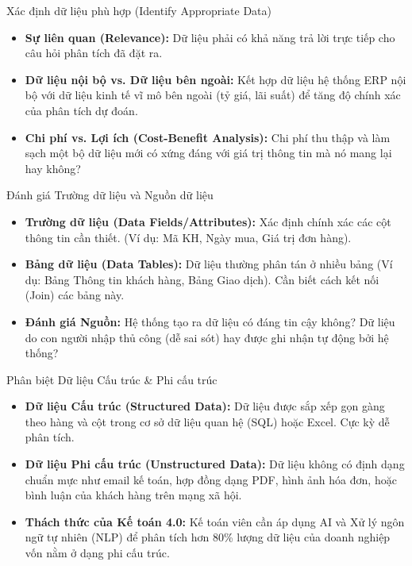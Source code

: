 \documentclass[aspectratio=169,12pt]{beamer}
\begin{document}
\begin{frame}{Xác định dữ liệu phù hợp (Identify Appropriate Data)}
\begin{itemize}
    \item \textbf{Sự liên quan (Relevance):} Dữ liệu phải có khả năng trả lời trực tiếp cho câu hỏi phân tích đã đặt ra. 
    \item \textbf{Dữ liệu nội bộ vs. Dữ liệu bên ngoài:} Kết hợp dữ liệu hệ thống ERP nội bộ với dữ liệu kinh tế vĩ mô bên ngoài (tỷ giá, lãi suất) để tăng độ chính xác của phân tích dự đoán.
    \item \textbf{Chi phí vs. Lợi ích (Cost-Benefit Analysis):} Chi phí thu thập và làm sạch một bộ dữ liệu mới có xứng đáng với giá trị thông tin mà nó mang lại hay không?
\end{itemize}
\end{frame}

\begin{frame}{Đánh giá Trường dữ liệu và Nguồn dữ liệu}
\begin{itemize}
    \item \textbf{Trường dữ liệu (Data Fields/Attributes):} Xác định chính xác các cột thông tin cần thiết. (Ví dụ: Mã KH, Ngày mua, Giá trị đơn hàng).
    \item \textbf{Bảng dữ liệu (Data Tables):} Dữ liệu thường phân tán ở nhiều bảng (Ví dụ: Bảng Thông tin khách hàng, Bảng Giao dịch). Cần biết cách kết nối (Join) các bảng này.
    \item \textbf{Đánh giá Nguồn:} Hệ thống tạo ra dữ liệu có đáng tin cậy không? Dữ liệu do con người nhập thủ công (dễ sai sót) hay được ghi nhận tự động bởi hệ thống?
\end{itemize}
\end{frame}

\begin{frame}{Phân biệt Dữ liệu Cấu trúc \& Phi cấu trúc}
\begin{itemize}
    \item \textbf{Dữ liệu Cấu trúc (Structured Data):} Dữ liệu được sắp xếp gọn gàng theo hàng và cột trong cơ sở dữ liệu quan hệ (SQL) hoặc Excel. Cực kỳ dễ phân tích.
    \item \textbf{Dữ liệu Phi cấu trúc (Unstructured Data):} Dữ liệu không có định dạng chuẩn mực như email kế toán, hợp đồng dạng PDF, hình ảnh hóa đơn, hoặc bình luận của khách hàng trên mạng xã hội.
    \item \textbf{Thách thức của Kế toán 4.0:} Kế toán viên cần áp dụng AI và Xử lý ngôn ngữ tự nhiên (NLP) để phân tích hơn 80\% lượng dữ liệu của doanh nghiệp vốn nằm ở dạng phi cấu trúc.
\end{itemize}
\end{frame}
\end{document}
